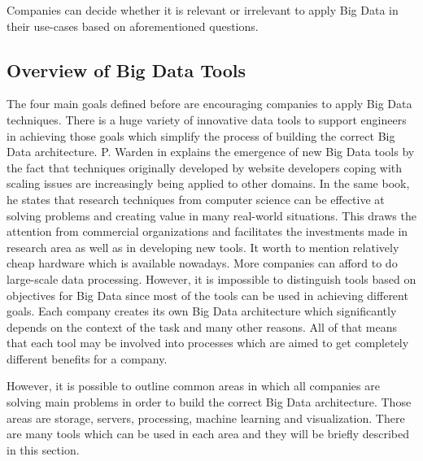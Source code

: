 \documentclass[runningheads]{llncs}
\begin{document}
Companies can decide whether it is relevant or irrelevant to apply Big Data in their use-cases based on aforementioned questions.
\subsection{Overview of Big Data Tools}

The four main goals defined before are encouraging companies to apply Big Data techniques. There is a huge variety of innovative data tools to support engineers in achieving those goals which simplify the process of building the correct Big Data architecture. P. Warden in \cite{GLOSSARY} explains the emergence of new Big Data tools by the fact that techniques originally developed by website developers coping with scaling issues are increasingly being applied to other domains. In the same book, he states that research techniques from computer science can be effective at solving problems and creating value in many real-world situations. This draws the attention from commercial organizations and facilitates the investments made in research area as well as in developing new tools. It worth to mention relatively cheap hardware which is available nowadays. More companies can afford to do large-scale data processing. However, it is impossible to distinguish tools based on objectives for Big Data since most of the tools can be used in achieving different goals. Each company creates its own Big Data architecture which significantly depends on the context of the task and many other reasons. All of that means that each tool may be involved into processes which are aimed to get completely different benefits for a company.   

However, it is possible to outline common areas in which all companies are solving main problems in order to build the correct Big Data architecture. Those areas are storage, servers, processing, machine learning and visualization. There are many tools which can be used in each area and they will be briefly described in this section. 
\end{document}
